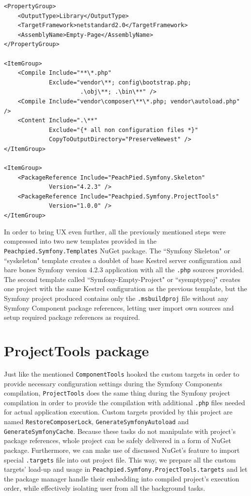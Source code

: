 \begin{center}
\begin{lstlisting}[caption={Empty-Page.msbuildproj},captionpos=b]
<PropertyGroup>
	<OutputType>Library</OutputType>
	<TargetFramework>netstandard2.0</TargetFramework>
    <AssemblyName>Empty-Page</AssemblyName>
</PropertyGroup>

<ItemGroup>
	<Compile Include="**\*.php" 
			 Exclude="vendor\**; config\bootstrap.php; 
					  .\obj\**; .\bin\**" />
	<Compile Include="vendor\composer\**\*.php; vendor\autoload.php" />
    <Content Include=".\**" 
			 Exclude="{* all non configuration files *}" 
			 CopyToOutputDirectory="PreserveNewest" />
</ItemGroup>

<ItemGroup>
    <PackageReference Include="PeachPied.Symfony.Skeleton" 
    		 Version="4.2.3" />
    <PackageReference Include="Peachpied.Symfony.ProjectTools" 
			 Version="1.0.0" />
</ItemGroup>
\end{lstlisting}
\end{center}

In order to bring UX even further, all the previously mentioned steps were compressed into two new templates provided in the \texttt{Peachpied.Symfony.Templates} NuGet package. The ``Symfony Skeleton" or ``syskeleton" template creates a doublet of base Kestrel server configuration and bare bones Symfony version 4.2.3 application with all the \texttt{.php} sources provided. The second template called ``Symfony-Empty-Project" or ``syemptyproj" creates one project with the same Kestrel configuration as the previous template, but the Symfony project produced contains only the \texttt{.msbuildproj} file without any Symfony Component package references, letting user import own sources and setup required package references as required.


\section{ProjectTools package}
Just like the mentioned \texttt{ComponentTools} hooked the custom targets in order to provide necessary configuration settings during the Symfony Components compilation, \texttt{ProjectTools} does the same thing during the Symfony project compilation in order to provide the compilation with additional \texttt{.php} files needed for actual application execution. Custom targets provided by this project are named \texttt{RestoreComposerLock}, \texttt{GenerateSymfonyAutoload} and \texttt{GenerateSymfonyCache}. Because these tasks do not manipulate with project's package references, whole project can be safely delivered in a form of NuGet package. Furthermore, we can make use of discussed NuGet's feature to import special \texttt{.targets} file into out project file. This way, we prepare all the custom targets' load-up and usage in \texttt{Peachpied.Symfony.ProjectTools.targets} and let the package manager handle their embedding into compiled project's execution order, while effectively isolating user from all the background tasks.

